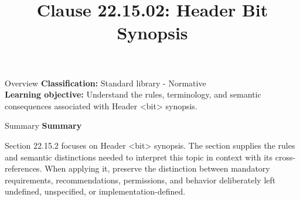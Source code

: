 \documentclass[10pt,letterpaper]{article}
\title{Clause 22.15.02: Header Bit Synopsis}
\author{}
\date{}
\begin{document}
\maketitle
\begin{CornellOverviewBox}{Overview}
\textbf{Classification:} Standard library - Normative\\[2pt]
\textbf{Learning objective:} Understand the rules, terminology, and semantic consequences associated with Header <bit> synopsis.
\end{CornellOverviewBox}\begin{CornellSummaryBox}{Summary}
{\sffamily\bfseries\color{Accent} Summary}\par\vspace{3pt}Section 22.15.2 focuses on Header <bit> synopsis. The section supplies the rules and semantic distinctions needed to interpret this topic in context with its cross-references. When applying it, preserve the distinction between mandatory requirements, recommendations, permissions, and behavior deliberately left undefined, unspecified, or implementation-defined.
\end{CornellSummaryBox}
\end{document}
